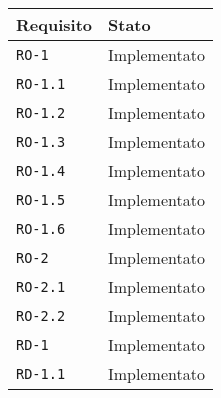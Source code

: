 \begin{center}
	
	\renewcommand{\arraystretch}{1.5}
	
	\centering
	\begin{longtable}{| C{2.5cm} | C{4cm} |}
		
		\hline
		
		\textbf{Requisito} &  \textbf{Stato} \\
		
		\hline
		
		\texttt{RO-1} & Implementato \\
		
		\hline 
		
		\texttt{RO-1.1} & Implementato \\
		
		\hline 
		
		\texttt{RO-1.2} & Implementato \\
		
		\hline 
		
		\texttt{RO-1.3} & Implementato \\
		
		\hline
		
		\texttt{RO-1.4} & Implementato  \\
		
		\hline 
		
		\texttt{RO-1.5} & Implementato \\
		
		\hline 
		
		\texttt{RO-1.6} & Implementato  \\
		
		\hline 
		
		\texttt{RO-2} &Implementato  \\
		
		\hline 
		
		\texttt{RO-2.1} & Implementato  \\
		
		\hline 
		
		\texttt{RO-2.2} & Implementato  \\
		
		\hline
		
		\texttt{RD-1} & Implementato  \\
		
		\hline 
		
		\texttt{RD-1.1} &Implementato  \\
		
		\hline 
		

\end{longtable}
\end{center}
